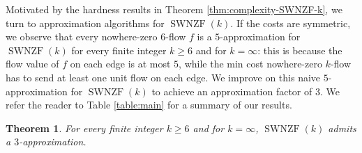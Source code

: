 \documentclass[11pt]{article}
\newtheorem{theorem}{Theorem}
\begin{document}
Motivated by the hardness results in Theorem \ref{thm:complexity-SWNZF-k}, we turn to approximation algorithms for $\operatorname{SWNZF}(k)$. If the costs are symmetric, we observe that every nowhere-zero $6$-flow $f$ is a $5$-approximation for $\operatorname{SWNZF}(k)$ for every finite integer $k\ge 6$ and for $k=\infty$: this is because the flow value of $f$ on each edge is at most $5$, while the min cost nowhere-zero $k$-flow has to send at least one unit flow on each edge. We improve on this naive $5$-approximation for $\operatorname{SWNZF}(k)$ to achieve an approximation factor of $3$. We refer the reader to Table \ref{table:main} for a summary of our results.
\begin{theorem}\label{thm:approx-SWNZF-k}
For every finite integer $k\ge 6$ and for $k=\infty$, $\operatorname{SWNZF}(k)$ admits a $3$-approximation. 
\end{theorem}
\end{document}
